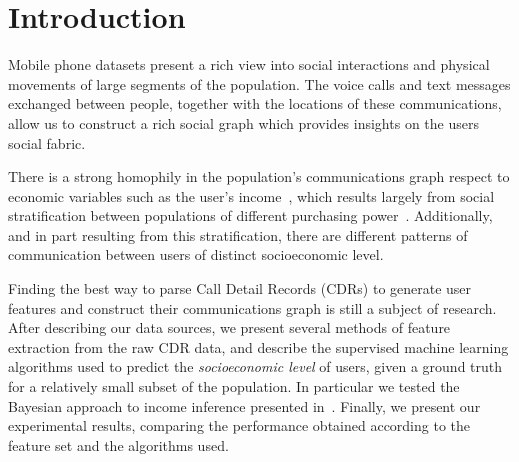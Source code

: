 \section{Introduction}

Mobile phone datasets present a rich view into social interactions and physical movements of large segments of the population.
The voice calls and text messages exchanged between people, together with the locations of these communications, allow us to construct a rich social graph which provides insights on the users social fabric.

There is a strong homophily in the population's communications graph respect to economic variables such as the user's income~\cite{fixmanasonam2016}, which results largely from social stratification between populations of different purchasing power~\cite{leo2015socioeconomic}.
Additionally, and in part resulting from this stratification, there are different patterns of communication between users of distinct socioeconomic level.

Finding the best way to parse Call Detail Records (CDRs) to generate user features and construct their communications graph is still a subject of research.  After describing our data sources, we present several methods of feature extraction from the raw CDR data,
and describe the supervised machine learning algorithms used to predict the \emph{socioeconomic level} of users, given a ground truth for a relatively small subset of the population. In particular we tested the Bayesian approach to income inference presented in~\cite{fixmanasonam2016}.
Finally, we present our experimental results, comparing the performance obtained according to the feature set and the algorithms used.
